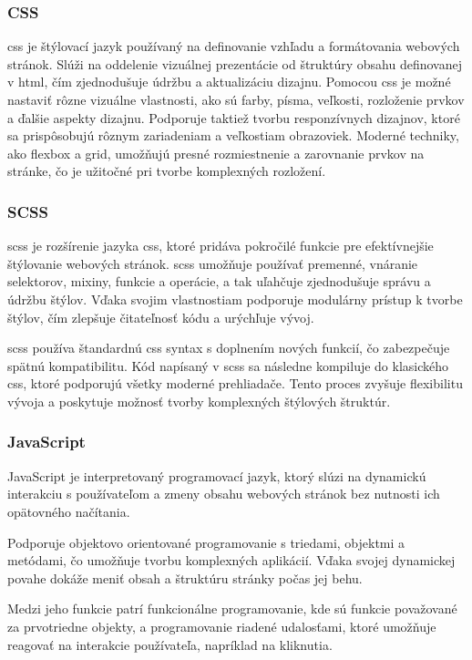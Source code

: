 \subsubsection*{CSS}
\acrfull{css} je štýlovací jazyk používaný na definovanie vzhľadu a formátovania webových stránok. 
Slúži na oddelenie vizuálnej prezentácie od štruktúry obsahu definovanej v \acrshort{html}, čím zjednodušuje údržbu a aktualizáciu dizajnu.
Pomocou \acrshort{css} je možné nastaviť rôzne vizuálne vlastnosti, ako sú farby, písma, veľkosti, rozloženie prvkov a ďalšie aspekty dizajnu.
 Podporuje taktiež tvorbu responzívnych dizajnov, ktoré sa prispôsobujú rôznym zariadeniam a veľkostiam obrazoviek. 
 Moderné techniky, ako flexbox a grid, umožňujú presné rozmiestnenie a zarovnanie prvkov na stránke, čo je užitočné pri tvorbe komplexných rozložení.\cite{css}

\subsubsection*{SCSS}
\acrfull{scss} je rozšírenie jazyka \acrshort{css}, ktoré pridáva pokročilé funkcie pre efektívnejšie štýlovanie webových stránok. 
\acrshort{scss} umožňuje používať premenné, vnáranie selektorov, mixiny, funkcie a operácie, a tak uľahčuje zjednodušuje správu a údržbu štýlov.
 Vďaka svojim vlastnostiam podporuje modulárny prístup k tvorbe štýlov, čím zlepšuje čitateľnosť kódu a urýchľuje vývoj.

 \acrshort{scss} používa štandardnú \acrshort{css} syntax s doplnením nových funkcií, čo zabezpečuje spätnú kompatibilitu.
 Kód napísaný v \acrshort{scss} sa následne kompiluje do klasického \acrshort{css}, ktoré podporujú všetky moderné prehliadače. 
Tento proces zvyšuje flexibilitu vývoja a poskytuje možnosť tvorby komplexných štýlových štruktúr.\cite{scss}
\subsubsection*{JavaScript}
JavaScript je interpretovaný programovací jazyk, ktorý slúzi na dynamickú interakciu s používateľom a zmeny obsahu webových stránok bez nutnosti ich opätovného načítania.

Podporuje objektovo orientované programovanie s triedami, objektmi a metódami, čo umožňuje tvorbu komplexných aplikácií. Vďaka svojej dynamickej povahe dokáže meniť obsah a štruktúru stránky počas jej behu.

Medzi jeho funkcie patrí funkcionálne programovanie, kde sú funkcie považované za prvotriedne objekty, a programovanie riadené udalosťami, ktoré umožňuje reagovať na interakcie používateľa, napríklad na kliknutia.

